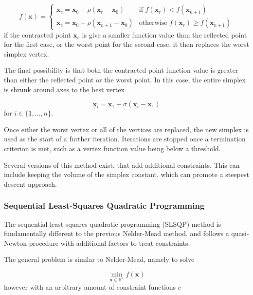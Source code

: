 \begin{equation}
    f\left(\mathbf{x}\right)= 
    \begin{cases}
    \mathbf{x}_c = \mathbf{x}_0 + \rho \left(\mathbf{x}_r - \mathbf{x}_0 \right)               & \text{if } f\left(\mathbf{x}_r\right) < f\left(\mathbf{x}_{n+1}\right)\\
    \mathbf{x}_c = \mathbf{x}_0 + \rho \left(\mathbf{x}_{n+1} - \mathbf{x}_0 \right)           & \text{otherwise } f\left(\mathbf{x}_r\right) \geq f\left(\mathbf{x}_{n+1}\right)
    \end{cases}
\end{equation}
%
if the contracted point $\mathbf{x}_c$ is give a smaller function value than the 
reflected point for the first case, or the worst point for the second case, it then
replaces the worst simplex vertex.

The final possibility is that both the contracted point function value is greater 
than either the reflected point or the worst point. In this case, the entire simplex
is shrunk around axes to the best vertex

\begin{equation}
\mathbf{x}_i = \mathbf{x}_1 + \sigma \left(\mathbf{x}_i - \mathbf{x}_1 \right)
\end{equation}
%
for $i \in \{1, \dots, n\}$.

Once either the worst vertex or all of the vertices are replaced, the new simplex
is used as the start of a further iteration. Iterations are stopped once a termination
criterion is met, such as a vertex function value being below a threshold.

Several versions of this method exist, that add additional constraints. This can
include keeping the volume of the simplex constant, which can promote a steepest
descent approach.

\subsubsection{Sequential Least-Squares Quadratic Programming}
\label{subsubsec:slsqp}
The sequential least-squares quadratic programming (SLSQP) method is fundamentally
different to the previous Nelder-Mead method, and follows a quasi-Newton procedure
with additional factors to treat constraints.

The general problem is similar to Nelder-Mead, namely to solve

\begin{equation}
\min_{\mathbf{x} \in \mathbb{R}^n} f\left( \mathbf{x}\right)
\end{equation}
%
however with an arbitrary amount of constraint functions $c$

